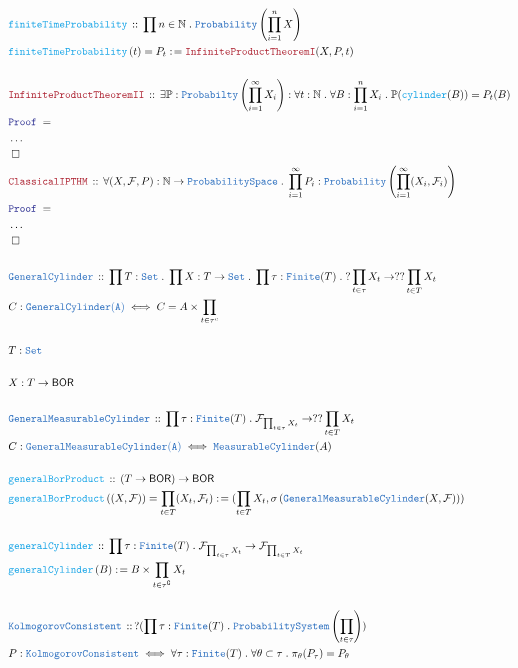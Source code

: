 \documentclass[12pt]{scrartcl}
\newcommand{\TYPE}[1]{\textcolor{NavyBlue}{\mathtt{#1}}}
\newcommand{\FUNC}[1]{\textcolor{Cerulean}{\mathtt{#1}}}
\newcommand{\LOGIC}[1]{\textcolor{Blue}{\mathtt{#1}}}
\newcommand{\THM}[1]{\textcolor{Maroon}{\mathtt{#1}}}
\renewcommand{\.}{\; . \;}
\newcommand{\de}{: \kern 0.1pc =}
\newcommand{\Act}[1]{\left( #1 \right)}
\newcommand{\Theorem}[2]{& \THM{#1} \, :: \, #2 \\ & \Proof = \\ }
\newcommand{\DeclareType}[2]{& \TYPE{#1} \, :: \, #2 \\}
\newcommand{\DefineType}[3]{& #1 : \TYPE{#2} \iff #3 \\}
\newcommand{\DeclareFunc}[2]{& \FUNC{#1} \, :: \, #2 \\}
\newcommand{\DefineFunc}[3]{&  \FUNC{#1}\Act{#2} \de #3 \\}
\newcommand{\DefineNamedFunc}[4]{&  \FUNC{#1}\Act{#2} = #3 \de #4 \\}
\newcommand{\ForEach}[3]{\forall #1 : #2 \. #3 }
\newcommand{\Nat}{\mathbb{N} }
\newcommand{\Set}{\TYPE{Set}}
\renewcommand{\c}{\complement}
\newcommand{\QED}{\; \square}
\newcommand{\EndProof}{& \QED \\}
\newcommand{\Proof}{\LOGIC{Proof} \; }
\newcommand{\BOR}{\mathsf{BOR}}
\newcommand{\F}{\mathcal{F}}
\begin{document}
\begin{align*}
\DeclareFunc{finiteTimeProbability}{ \prod n \in \Nat \. \TYPE{Probability}\left ( \prod^n_{i = 1} X  \right )  }
\DefineNamedFunc{finiteTimeProbability}{ t  }{ P_t }{ \THM{InfiniteProductTheoremI}(X, P, t )  }
\\
\Theorem{InfiniteProductTheoremII}{
\exists \mathbb{P} : \TYPE{Probabilty}\left(  \prod^\infty_{i = 1} X_i  \right) : 
\ForEach{ t }{ \Nat }{ \ForEach{ B }{ \prod^n_{i = 1} X_i  }{
 \mathbb{P}( \FUNC{cylinder}(B)  ) =  P_t(B)   
} } } 
& \ldots \\
\EndProof 
\Theorem{ClassicalIPTHM}{
\ForEach{ (X,\F,P) }{ \Nat \to \TYPE{ProbabilitySpace}  }
{ \prod^\infty_{i = 1} P_i : \TYPE{Probability}\left(  \prod^\infty_{i = 1} (X_i,\F_i) \right)  
}}
& \ldots \\
\EndProof
\\
\DeclareType{GeneralCylinder}{   \prod T : \Set \.\prod X : T \to \Set \. \prod \tau : \TYPE{Finite}(T) \. ?\prod_{t \in \tau } X_t \to ??\prod_{t \in T} X_t }
\DefineType{C}{\TYPE{GeneralCylinder}(A)}{  C = A \times \prod_{t \in \tau^c} }    
\\
& T : \Set \\
\\
& X : T \to \BOR \\
\\
\DeclareType{GeneralMeasurableCylinder}{  \prod \tau : \TYPE{Finite}(T) \. \F_{\prod_{t \in \tau} X_t} \to ??\prod_{t \in T} X_t }
\DefineType{C}{ \TYPE{GeneralMeasurableCylinder}(A)}{ \TYPE{MeasurableCylinder}(A)  }
\\
\DeclareFunc{generalBorProduct}{  (T \to  \BOR ) \to \BOR    }
\DefineNamedFunc{generalBorProduct}{ (X, \F) }{ \prod_{t \in T} (X_t, \F_t)  }{  ( \prod_{t \in T} X_t, \sigma \left( \TYPE{GeneralMeasurableCylinder}(X, \F) \right)   )  }
\\
\DeclareFunc{generalCylinder}{ \prod \tau : \TYPE{Finite}(T) \. \F_{\prod_{t \in \tau} X_t } \to \F_{\prod_{t \in T} X_t }}
\DefineFunc{generalCylinder}{ B  }{ B \times \prod_{t \in \tau^\c} X_t}
\\
\DeclareType{KolmogorovConsistent}{ ?( \prod \tau : \TYPE{Finite}(T) \. \TYPE{ProbabilitySystem}\left( \prod_{t \in \tau}  \right) )  }
\DefineType{ P }{KolmogorovConsistent}{ \forall \tau : \TYPE{Finite}(T) \. \forall \theta \subset \tau \. \pi_\theta( P_\tau) = P_\theta  }
\end{align*}
\newpage
\end{document}
